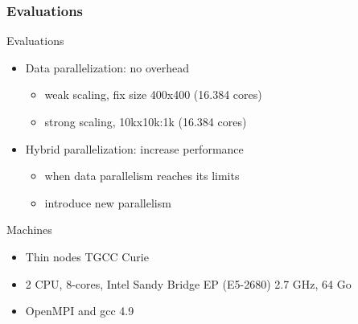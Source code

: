 \documentclass{beamer}
\begin{document}
\begin{frame}
\frametitle{Evaluations}
\begin{block}{Evaluations}
\begin{itemize}
\item Data parallelization: no overhead
  \begin{itemize}
  \item weak scaling, fix size 400x400 (16.384 cores)
  \item strong scaling, 10kx10k:1k (16.384 cores)
  \end{itemize}
\item Hybrid parallelization: increase performance\\
  \begin{itemize}
  \item when data parallelism reaches its limits
  \item introduce new parallelism
  \end{itemize}
\end{itemize}
\end{block}

\begin{block}{Machines}
\begin{itemize}
\item Thin nodes TGCC Curie
\item 2 CPU, 8-cores, Intel Sandy Bridge EP (E5-2680) 2.7 GHz, 64 Go
\item OpenMPI and gcc 4.9
\end{itemize}
\end{block}
\end{frame}
\end{document}
